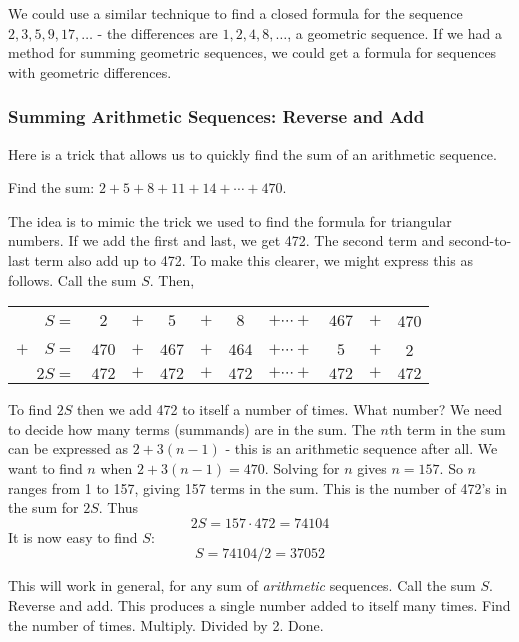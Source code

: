 \documentclass[12pt]{article}
\begin{document}
We could use a similar technique to find a closed formula for the sequence $2, 3, 5, 9, 17, \ldots$ - the differences are $1, 2, 4, 8, \ldots$, a geometric sequence.  If we had a method for summing geometric sequences, we could get a formula for sequences with geometric differences.

\subsubsection*{Summing Arithmetic Sequences: Reverse and Add}
Here is a trick that allows us to quickly find the sum of an arithmetic sequence. 

\begin{example}
  Find the sum:  $2 + 5 + 8 + 11 + 14 + \cdots + 470$.
  
  \begin{solution}
    The idea is to mimic the trick we used to find the formula for triangular numbers.  If we add the first and last, we get 472.  The second term and second-to-last term also add up to 472.  To make this clearer, we might express this as follows.  Call the sum $S$.  Then,
    
    \begin{center}
    \begin{tabular}{rccccccccc}
      $S  =  $& $2 $&$ + $& $5$ & $ + $ & $8$ & $+ \cdots + $ & $467$ &$ + $ & 470 \\
     $+ \quad S  = $& $470$ & $+ $ & $467$ & $ + $ & $464$& $+ \cdots + $&$ 5$ & $+$ & 2 \\ \hline
     $2S  = $& $472$ & $+ $ & $472$ & $ + $ & $472$& $+ \cdots + $&$472$ & $+$ & $472$ \\
    \end{tabular}
    \end{center}
    
    To find $2S$ then we add 472 to itself a number of times.  What number?  We need to decide how many terms (summands) are in the sum.  The $n$th term in the sum can be expressed as $2 + 3(n-1)$ - this is an arithmetic sequence after all.  We want to find $n$ when $2 + 3(n-1) = 470$.  Solving for $n$ gives $n = 157$.  So $n$ ranges from 1 to 157, giving 157 terms in the sum.  This is the number of 472's in the sum for $2S$.  Thus
    \[2S = 157\cdot 472 = 74104\]
    It is now easy to find $S$:
    \[S = 74104/2 = 37052\]
  \end{solution}
\end{example}

This will work in general, for any sum of {\em arithmetic} sequences.  Call the sum $S$.  Reverse and add.  This produces a single number added to itself many times.  Find the number of times.  Multiply.  Divided by 2.  Done.
\end{document}

